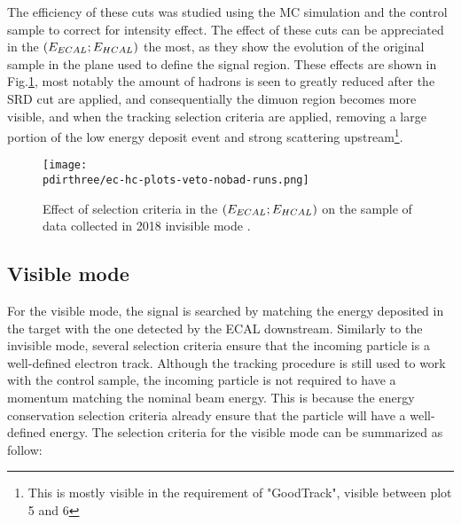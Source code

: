The efficiency of these cuts was studied using the MC simulation and the control sample to correct for intensity effect.
The effect of these cuts can be appreciated in the $(E_{ECAL};E_{HCAL})$ the most, as they show the evolution of the original sample in the plane used to define the signal region. These effects are shown in Fig.\ref{fig:inv-cut-ehcal}, most notably the amount of hadrons is seen to greatly reduced after the SRD cut are applied, and consequentially the dimuon region becomes more visible, and when the tracking selection criteria are applied, removing a large portion of the low energy deposit event and strong scattering upstream\footnote{This is mostly visible in the requirement of "GoodTrack", visible between plot 5 and 6}.


\begin{figure}[bth!]
  \centering
   \texttt{[image: \\pdirthree/ec-hc-plots-veto-nobad-runs.png]}
  \caption[effect of the cuts in invisible mode]{Effect of selection criteria in the $(E_{ECAL};E_{HCAL})$ on the sample of data collected in 2018 invisible mode \cite{invis-cut-plot,NA64:2019imj}.}
  \label{fig:inv-cut-ehcal}
\end{figure}

\subsection{Visible mode}
\label{ch3:sec:selection-criteria-vis}

For the visible mode, the signal is searched by matching the energy deposited in the target with the one detected by the ECAL downstream. Similarly to the invisible mode, several selection criteria ensure that the incoming particle is a well-defined electron track. Although the tracking procedure is still used to work with the control sample, the incoming particle is not required to have a momentum matching the nominal beam energy. This is because the energy conservation selection criteria already ensure that the particle will have a well-defined energy. The selection criteria for the visible mode can be summarized as follow:

